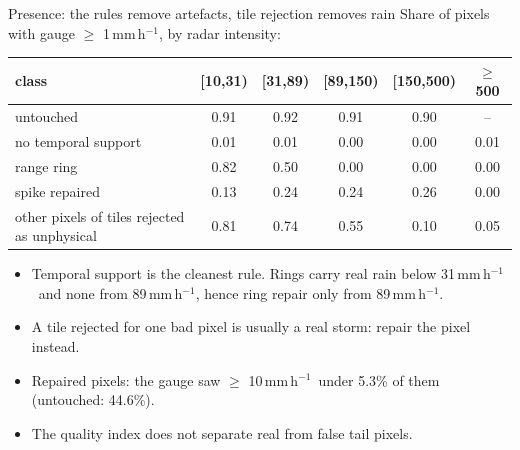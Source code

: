 \documentclass[aspectratio=169,10pt]{beamer}
\newcommand{\mmh}{\,mm\,h$^{-1}$}
\begin{document}
\begin{frame}{Presence: the rules remove artefacts, tile rejection removes rain}
  \footnotesize
  \centering
  Share of pixels with gauge $\ge$ 1\mmh, by radar intensity:
  \vspace{1mm}

  \begin{tabular}{lccccc}
    \toprule
    class & [10,31) & [31,89) & [89,150) & [150,500) & $\ge$500 \\
    \midrule
    untouched & 0.91 & 0.92 & 0.91 & 0.90 & -- \\
    no temporal support & 0.01 & 0.01 & 0.00 & 0.00 & 0.01 \\
    range ring & 0.82 & 0.50 & 0.00 & 0.00 & 0.00 \\
    spike repaired & 0.13 & 0.24 & 0.24 & 0.26 & 0.00 \\
    other pixels of tiles rejected as unphysical & 0.81 & 0.74 & 0.55 & 0.10 & 0.05 \\
    \bottomrule
  \end{tabular}
  \vspace{2mm}

  \raggedright\small
  \begin{itemize}
    \item Temporal support is the cleanest rule. Rings carry real rain below 31\mmh\ and none
      from 89\mmh, hence ring repair only from 89\mmh.
    \item A tile rejected for one bad pixel is usually a real storm: repair the pixel instead.
    \item Repaired pixels: the gauge saw $\ge$ 10\mmh\ under 5.3\% of them (untouched: 44.6\%).
    \item The quality index does not separate real from false tail pixels.
  \end{itemize}
\end{frame}
\end{document}
